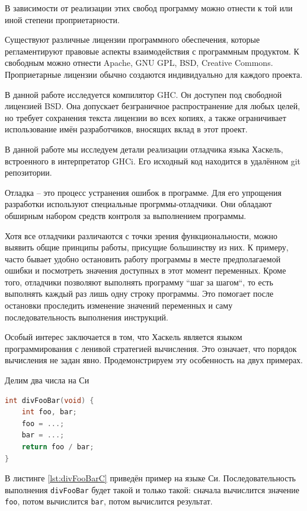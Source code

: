 \documentclass[fontsize=14pt, paper=a4, pagesize, DIV=calc]{scrartcl}
\def\code#1{\texttt{#1}}
\begin{document}
В зависимости от реализации этих свобод программу можно отнести к той или иной
степени проприетарности.

Существуют различные лицензии программного обеспечения, которые регламентируют
правовые аспекты взаимодействия с программным продуктом. К свободным можно
отнести Apache, GNU GPL, BSD, Creative Commons. Проприетарные лицензии обычно
создаются индивидуально для каждого проекта.

В данной работе исследуется компилятор GHC. Он доступен под свободной лицензией
BSD. Она допускает безграничное распространение для любых целей, но требует
сохранения текста лицензии во всех копиях, а также ограничивает использование
имён разработчиков, вносящих вклад в этот проект.

В данной работе мы исследуем детали реализации отладчика языка Хаскель,
встроенного в интерпретатор GHCi. Его исходный код находится в удалённом git
репозитории\cite{gitrepo}.

Отладка -- это процесс устранения ошибок в программе. Для его упрощения
разработки используют специальные прогрммы-отладчики. Они обладают обширным
набором средств контроля за выполнением программы. 

Хотя все отладчики различаются с точки зрения функциональности, можно выявить
общие принципы работы, присущие большинству из них. К примеру, часто бывает
удобно остановить работу программы в месте предполагаемой ошибки и посмотреть
значения доступных в этот момент переменных. Кроме того, отладчики позволяют
выполнять программу ``шаг за шагом``, то есть выполнять каждый раз лишь одну
строку программы. Это помогает после остановки проследить изменение значений
переменных и саму последовательность выполнения инструкций.

Особый интерес заключается в том, что Хаскель является языком программирования
с ленивой стратегией вычисления. Это означает, что порядок вычисления не задан
явно. Продемонстрируем эту особенность на двух примерах.

\begin{ListingEnv}
\caption{Делим два числа на Си}
\label{lst:divFooBarC}
\begin{lstlisting}[language=c]
int divFooBar(void) {
    int foo, bar;
    foo = ...;
    bar = ...;
    return foo / bar;
}
\end{lstlisting}
\end{ListingEnv}

В листинге \ref{lst:divFooBarC} приведён пример на языке Си. Последовательность
выполнения \code{divFooBar} будет такой и только такой: сначала вычислится
значение \code{foo}, потом вычислится \code{bar}, потом вычислится результат.
\end{document}
